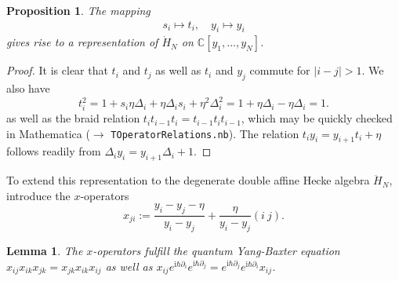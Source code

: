 \documentclass[11pt]{report}
\newtheorem{lemma}[theorem]{Lemma}
\newtheorem{prop}[theorem]{Proposition}
\theoremstyle{definition}
\theoremstyle{remark}
\theoremstyle{remark}
\newcommand{\C}{\mathbb{C}}
\newcommand{\I}{\mathrm{i}}
\begin{document}
\begin{prop}
The mapping
\begin{align*}
s_i \mapsto t_i, \quad y_i \mapsto y_i
\end{align*}
gives rise to a representation of $\dot H_N$ on $\C[y_1,...,y_N]$.
\end{prop}

\begin{proof}
It is clear that $t_i$ and $t_j$ as well as $t_i$ and $y_j$ commute for $|i-j|>1$. We also have
\begin{equation*}
t_i^2 = 1 + s_i \eta \Delta_i + \eta \Delta_i s_i + \eta^2 \Delta_i^2 = 1 + \eta \Delta_i - \eta \Delta_i = 1.
\end{equation*}
as well as the braid relation $t_i t_{i-1} t_i = t_{i-1} t_i t_{i-1}$, which may be quickly checked in Mathematica ($\to$ \texttt{TOperatorRelations.nb}). The relation $t_i y_i = y_{i+1} t_i + \eta$ follows readily from $\Delta_i y_i = y_{i+1} \Delta_i + 1$.
\end{proof}

To extend this representation to the degenerate double affine Hecke algebra $\ddot H_N$, introduce the $x$-operators
\begin{equation*}
x_{ji} := \frac{y_i-y_j-\eta}{y_i-y_j} + \frac{\eta}{y_i-y_j} (i \ j).
\end{equation*}

\begin{lemma}\label{lemma:xOpLemma}
The $x$-operators fulfill the quantum Yang-Baxter equation $x_{ij} x_{ik} x_{jk} = x_{jk} x_{ik} x_{ij}$ as well as $x_{ij} e^{\I\hbar \partial_i} e^{\I\hbar \partial_j} = e^{\I\hbar \partial_j} e^{\I\hbar \partial_i} x_{ij}$.
\end{lemma}
\end{document}
